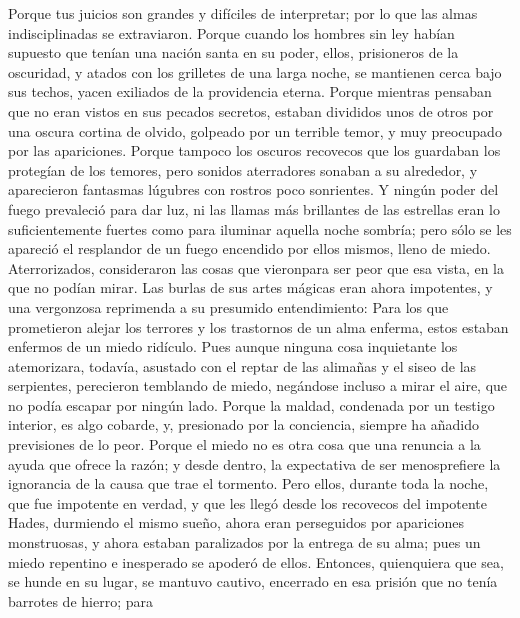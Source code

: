  Porque tus juicios son grandes y difíciles de
interpretar; por lo que las almas indisciplinadas se extraviaron.
 Porque cuando los hombres sin ley habían supuesto que
tenían una nación santa en su poder, ellos, prisioneros de la oscuridad,
y atados con los grilletes de una larga noche, se mantienen cerca bajo
sus techos, yacen exiliados de la providencia eterna. 
Porque mientras pensaban que no eran vistos en sus pecados secretos,
estaban divididos unos de otros por una oscura cortina de olvido,
golpeado por un terrible temor, y muy preocupado por las apariciones.
 Porque tampoco los oscuros recovecos que los guardaban
los protegían de los temores, pero sonidos aterradores sonaban a su
alrededor, y aparecieron fantasmas lúgubres con rostros poco sonrientes.
 Y ningún poder del fuego prevaleció para dar luz, ni las
llamas más brillantes de las estrellas eran lo suficientemente fuertes
como para iluminar aquella noche sombría;  pero sólo se
les apareció el resplandor de un fuego encendido por ellos mismos, lleno
de miedo. Aterrorizados, consideraron las cosas que vieronpara ser peor
que esa vista, en la que no podían mirar.  Las burlas de
sus artes mágicas eran ahora impotentes, y una vergonzosa reprimenda a
su presumido entendimiento:  Para los que prometieron
alejar los terrores y los trastornos de un alma enferma, estos estaban
enfermos de un miedo ridículo.  Pues aunque ninguna cosa
inquietante los atemorizara, todavía, asustado con el reptar de las
alimañas y el siseo de las serpientes,  perecieron
temblando de miedo, negándose incluso a mirar el aire, que no podía
escapar por ningún lado.  Porque la maldad, condenada por
un testigo interior, es algo cobarde, y, presionado por la conciencia,
siempre ha añadido previsiones de lo peor.  Porque el
miedo no es otra cosa que una renuncia a la ayuda que ofrece la razón;
 y desde dentro, la expectativa de ser menosprefiere la
ignorancia de la causa que trae el tormento.  Pero ellos,
durante toda la noche, que fue impotente en verdad, y que les llegó
desde los recovecos del impotente Hades, durmiendo el mismo sueño,
 ahora eran perseguidos por apariciones monstruosas, y
ahora estaban paralizados por la entrega de su alma; pues un miedo
repentino e inesperado se apoderó de ellos.  Entonces,
quienquiera que sea, se hunde en su lugar, se mantuvo cautivo, encerrado
en esa prisión que no tenía barrotes de hierro;  para
